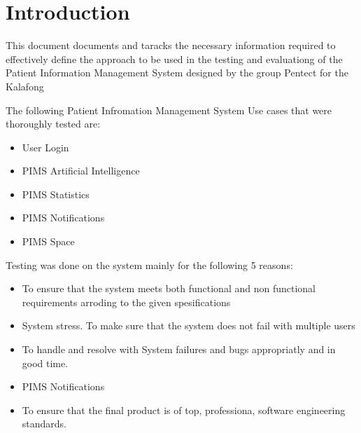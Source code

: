 \section{Introduction}

This document documents and taracks the necessary information required to effectively define the approach to be used in the testing and evaluationg of the Patient Information Management System designed by the group Pentect for the Kalafong 

The following Patient Infromation Management System Use cases that were thoroughly tested are:

\begin{itemize}
	\item User Login
	\item PIMS Artificial Intelligence
	\item PIMS Statistics
	\item PIMS Notifications
	\item PIMS Space
\end{itemize}

Testing was done on the system mainly for the following 5 reasons:

\begin{itemize}
	\item To ensure that the system meets both functional and non functional requirements arroding to the given spesifications
	\item System stress. To make sure that the system does not fail with multiple users
	\item To handle and resolve with System failures and bugs appropriatly and in good time.
	\item PIMS Notifications
	\item To ensure that the final product is of top, professiona, software engineering standards.
\end{itemize}

